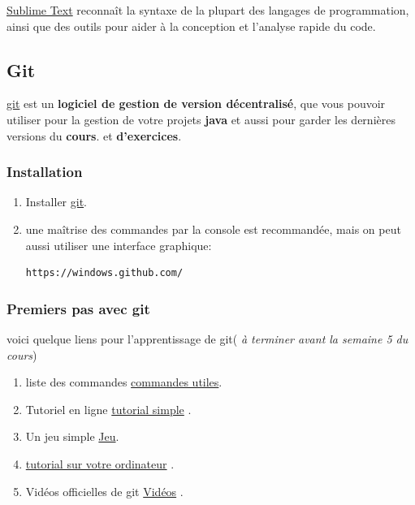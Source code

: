 \documentclass[letterpaper,10pt,english]{sphinxmanual}
\begin{document}
\href{http://www.sublimetext.com/}{Sublime Text} reconnaît la  syntaxe de la plupart des langages de programmation, ainsi que des outils pour aider à la conception et l'analyse rapide du code.


\subsection{Git}
\label{installation:git}
\href{http://fr.wikipedia.org/wiki/Git}{git}  est un \textbf{logiciel de gestion de version décentralisé}, que vous pouvoir utiliser pour la gestion de votre projets \textbf{java} et aussi pour garder les dernières versions du \textbf{cours}. et \textbf{d'exercices}.


\subsubsection{Installation}
\label{installation:id4}\begin{enumerate}
\item {} 
Installer \href{http://git-scm.com/}{git}.

\item {} 
une maîtrise des commandes par la console est recommandée, mais on peut aussi utiliser une interface graphique:

\begin{Verbatim}[commandchars=\\\{\}]
https://windows.github.com/
\end{Verbatim}

\end{enumerate}


\subsubsection{Premiers pas avec git}
\label{installation:premiers-pas-avec-git}
voici quelque liens pour l'apprentissage de git( \emph{à terminer avant la semaine 5 du cours})
\begin{enumerate}
\item {} 
liste des commandes \href{https://training.github.com/kit/downloads/github-git-cheat-sheet.pdf}{commandes utiles}.

\item {} 
Tutoriel en ligne \href{https://try.github.io/}{tutorial simple} .

\item {} 
Un jeu simple \href{http://pcottle.github.io/learnGitBranching/}{Jeu}.

\item {} 
\href{http://gitimmersion.com/}{tutorial sur votre ordinateur} .

\item {} 
Vidéos officielles de git \href{http://git-scm.com/videos/}{Vidéos} .

\end{enumerate}
\end{document}
